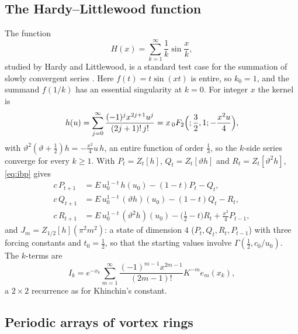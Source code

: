 \documentclass[11pt,reqno]{amsart}
\theoremstyle{definition}
\theoremstyle{remark}
\begin{document}
\subsection{The Hardy--Littlewood function}\label{sec:HL}
The function
\[
  H(x) = \sum_{k=1}^{\infty}\frac1k\sin\frac xk,
\]
studied by Hardy and Littlewood, is a standard test case for the summation of slowly convergent series
\cite{Gau05,Mon10}. Here $f(t) = t\sin(xt)$ is entire, so $k_0 = 1$, and the
summand $f(1/k)$ has an essential singularity at $k = 0$. For integer $x$ the kernel is
\[
  h(u) = \sum_{j=0}^{\infty}\frac{(-1)^jx^{2j+1}u^j}{(2j+1)!\,j!} = x\,{}_0F_2\Bigl(;\frac32,1;-\frac{x^2u}4\Bigr),
\]
with $\vartheta^2(\vartheta+\frac12)h = -\frac{x^2}{4}u\,h$,
an entire function of order $\frac13$, so the $k$-side series converge for every $k \ge 1$. With
$P_t = Z_t[h]$, $Q_t = Z_t[\vartheta h]$ and $R_t = Z_t[\vartheta^2h]$, \eqref{eq:ibp} gives
\begin{align*}
  c\,P_{t+1} &= E\,u_0^{1-t}\,h(u_0) - (1-t)P_t - Q_t, \\
  c\,Q_{t+1} &= E\,u_0^{1-t}\,(\vartheta h)(u_0) - (1-t)Q_t - R_t, \\
  c\,R_{t+1} &= E\,u_0^{1-t}\,(\vartheta^2h)(u_0) - \bigl(\tfrac12 - t\bigr)R_t + \tfrac{x^2}{4}P_{t-1},
\end{align*}
and $J_m = Z_{1/2}[h](\pi^2m^2)$: a state of dimension $4$ ($P_t, Q_t, R_t, P_{t-1}$) with three forcing constants and
$t_0 = \frac12$, so that the starting values involve $\Gamma(\frac12, c_0/u_0)$. The $k$-terms are
\[
  I_k = e^{-x_k}\sum_{m=1}^{\infty}\frac{(-1)^{m-1}x^{2m-1}}{(2m-1)!}K^{-m}e_m(x_k),
\]
a $2\times2$ recurrence as for Khinchin's constant.

\subsection{Periodic arrays of vortex rings}\label{sec:vortex}
\end{document}
